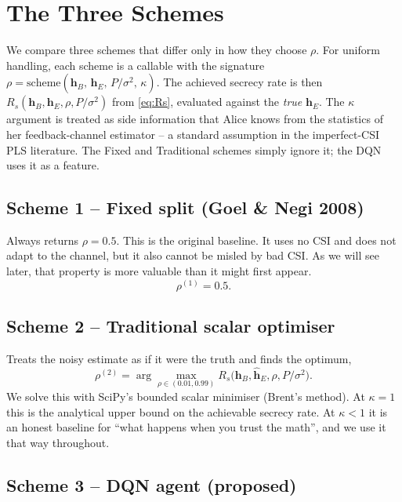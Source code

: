\documentclass[conference]{IEEEtran}
\begin{document}
\section{The Three Schemes}\label{sec:schemes}

We compare three schemes that differ only in how they choose $\rho$.
For uniform handling, each scheme is a callable with the signature
$\rho = \mathrm{scheme}(\mathbf{h}_B,\, \hat{\mathbf{h}}_E,\,
P/\sigma^2,\, \kappa)$. The achieved secrecy rate is then
$R_s(\mathbf{h}_B, \mathbf{h}_E, \rho, P/\sigma^2)$ from
\eqref{eq:Rs}, evaluated against the \emph{true} $\mathbf{h}_E$. The
$\kappa$ argument is treated as side information that Alice knows from
the statistics of her feedback-channel estimator -- a standard
assumption in the imperfect-CSI PLS literature. The Fixed and
Traditional schemes simply ignore it; the DQN uses it as a feature.

\subsection{Scheme 1 -- Fixed split (Goel \& Negi 2008)}
Always returns $\rho = 0.5$. This is the original baseline. It uses no
CSI and does not adapt to the channel, but it also cannot be misled by
bad CSI. As we will see later, that property is more valuable than it
might first appear.
\begin{equation}
\rho^{(1)} = 0.5.
\end{equation}

\subsection{Scheme 2 -- Traditional scalar optimiser}
Treats the noisy estimate as if it were the truth and finds the
optimum,
\begin{equation}
\rho^{(2)} = \arg\max_{\rho \in (0.01, 0.99)}
  R_s\bigl(\mathbf{h}_B, \hat{\mathbf{h}}_E, \rho, P/\sigma^2\bigr).
\end{equation}
We solve this with SciPy's bounded scalar minimiser (Brent's method).
At $\kappa = 1$ this is the analytical upper bound on the achievable
secrecy rate. At $\kappa < 1$ it is an honest baseline for ``what
happens when you trust the math'', and we use it that way throughout.

\subsection{Scheme 3 -- DQN agent (proposed)}
\end{document}
